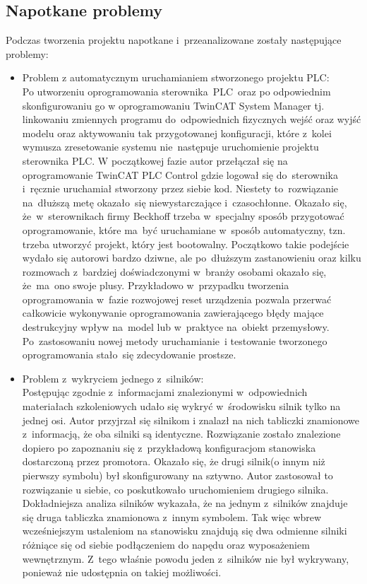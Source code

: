 \subsection{Napotkane problemy}
\label{subsec:problemy}
Podczas tworzenia projektu napotkane i~przeanalizowane zostały następujące problemy:
\begin{itemize}
\item Problem z automatycznym uruchamianiem stworzonego projektu PLC:\\[1mm]
Po utworzeniu oprogramowania sterownika~PLC~oraz po odpowiednim skonfigurowaniu go w oprogramowaniu TwinCAT System Manager tj. linkowaniu zmiennych programu do~odpowiednich fizycznych wejść oraz wyjść modelu oraz aktywowaniu tak przygotowanej konfiguracji, które z~kolei wymusza zresetowanie systemu nie~następuje uruchomienie projektu sterownika PLC. W początkowej fazie autor przełączał się na oprogramowanie TwinCAT PLC Control gdzie logował się do~sterownika i~ręcznie uruchamiał stworzony przez siebie kod. Niestety to~rozwiązanie na~dłuższą metę okazało~się niewystarczające i~czasochłonne. Okazało się, że~w~sterownikach firmy Beckhoff trzeba w~specjalny sposób przygotować oprogramowanie, które ma~być uruchamiane w~sposób automatyczny, tzn. trzeba utworzyć projekt, który jest bootowalny. Początkowo takie podejście wydało się autorowi bardzo dziwne, ale po~dłuższym zastanowieniu oraz kilku rozmowach z~bardziej doświadczonymi w~branży osobami okazało się, że~ma~ono swoje plusy. Przykładowo w~przypadku tworzenia oprogramowania w~fazie rozwojowej reset urządzenia pozwala przerwać całkowicie wykonywanie oprogramowania zawierającego błędy mające destrukcyjny wpływ na~model lub w~praktyce na~obiekt przemysłowy. Po~zastosowaniu nowej metody uruchamianie~i testowanie tworzonego oprogramowania stało~się zdecydowanie prostsze.

\item Problem z~wykryciem jednego z~silników:\\[1mm]
Postępując zgodnie z~informacjami znalezionymi w~odpowiednich materiałach szkoleniowych udało się wykryć w~środowisku silnik tylko na jednej osi. Autor przyjrzał się silnikom i znalazł na nich tabliczki znamionowe z~informacją, że oba silniki są identyczne. Rozwiązanie zostało znalezione dopiero po zapoznaniu się z~przykładową konfiguracjom stanowiska dostarczoną przez promotora. Okazało się, że drugi silnik(o innym niż pierwszy symbolu) był skonfigurowany na sztywno. Autor zastosował to rozwiązanie u siebie, co poskutkowało uruchomieniem drugiego silnika. Dokładniejsza analiza silników wykazała, że na jednym z~silników znajduje się druga tabliczka znamionowa z~innym symbolem. Tak więc wbrew wcześniejszym ustaleniom na stanowisku znajdują się dwa odmienne silniki różniące się od siebie podłączeniem do napędu oraz wyposażeniem wewnętrznym. Z~tego właśnie powodu jeden z~silników nie był wykrywany, ponieważ nie udostępnia on takiej możliwości.


\end{itemize}

